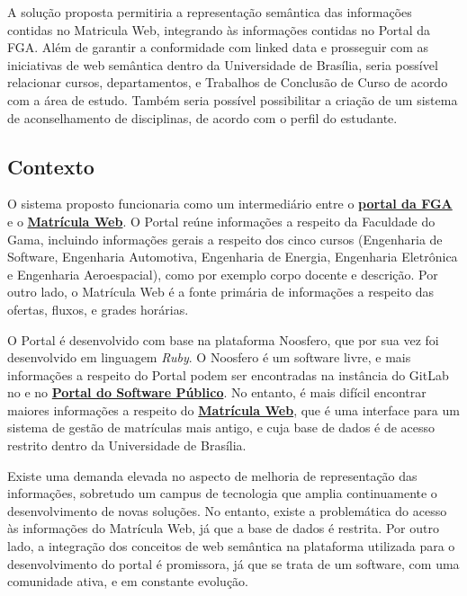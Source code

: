 
A solução proposta permitiria a representação semântica das informações contidas no Matricula Web, integrando às informações contidas no Portal da FGA. Além de garantir a conformidade com linked data e prosseguir com as iniciativas de web semântica dentro da Universidade de Brasília, seria possível relacionar cursos, departamentos, e Trabalhos de Conclusão de Curso de acordo com a área de estudo. Também seria possível possibilitar a criação de um sistema de aconselhamento de disciplinas, de acordo com o perfil do estudante.

\subsection{Contexto} %
\label{sub:contexto}

O sistema proposto funcionaria como um intermediário entre o \href{https://fga.unb.br/}{\textbf{portal da FGA}} e o \href{http://matriculaweb.unb.br}{\textbf{Matrícula Web}}. O Portal reúne informações a respeito da Faculdade do Gama, incluindo informações gerais a respeito dos cinco cursos (Engenharia de Software, Engenharia Automotiva, Engenharia de Energia, Engenharia Eletrônica e Engenharia Aeroespacial), como por exemplo corpo docente e descrição. Por outro lado, o Matrícula Web é a fonte primária de informações a respeito das ofertas, fluxos, e grades horárias. 

O Portal é desenvolvido com base na plataforma Noosfero, que por sua vez foi desenvolvido em linguagem \textit{Ruby}. O Noosfero é um software livre, e mais informações a respeito do Portal podem ser encontradas na instância do GitLab no e no \href{https://softwarepublico.gov.br/}{\textbf{Portal do Software Público}}. No entanto, é mais difícil encontrar maiores informações a respeito do \href{http://matriculaweb.unb.br}{\textbf{Matrícula Web}}, que é uma interface para um sistema de gestão de matrículas mais antigo, e cuja base de dados é de acesso restrito dentro da Universidade de Brasília.

Existe uma demanda elevada no aspecto de melhoria de representação das informações, sobretudo um campus de tecnologia que amplia continuamente o desenvolvimento de novas soluções. No entanto, existe a problemática do acesso às informações do Matrícula Web, já que a base de dados é restrita. Por outro lado, a integração dos conceitos de web semântica na plataforma utilizada para o desenvolvimento do portal é promissora, já que se trata de um software, com uma comunidade ativa, e em constante evolução.
